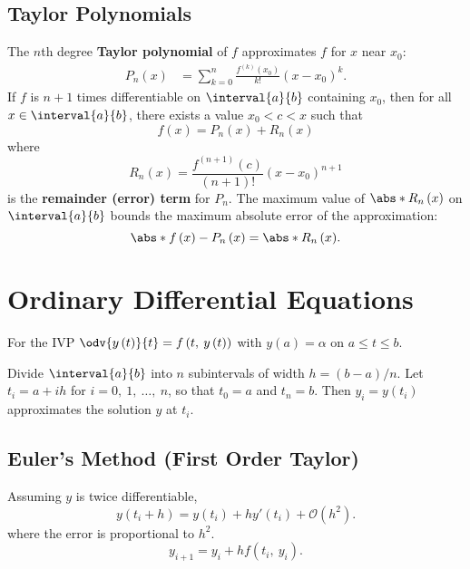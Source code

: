 \documentclass{article}
\begin{document}
\begin{multicols}{3}
    \subsection{Taylor Polynomials}
    The \(n\)th degree \textbf{Taylor polynomial} of \(f\)
    approximates \(f\) for \(x\) near \(x_0\):
    \begin{align*}
        P_n\left( x \right) & = \sum_{k = 0}^n \frac{f^{\left( k \right)}\left( x_0 \right)}{k!} \left( x - x_0 \right)^k.
    \end{align*}
    If \(f\) is \(n + 1\) times differentiable on \(\interval{a}{b}\) containing \(x_0\),
    then for all \(x \in \interval{a}{b}\),
    there exists a value \(x_0 < c < x\) such that
    \begin{equation*}
        f\left( x \right) = P_n\left( x \right) + R_n\left( x \right)
    \end{equation*}
    where
    \begin{equation*}
        R_n\left( x \right) = \frac{f^{\left( n + 1 \right)}\left( c \right)}{\left( n + 1 \right)!} \left( x - x_0 \right)^{n + 1}
    \end{equation*}
    is the \textbf{remainder (error) term} for \(P_n\).
    The maximum value of \(\abs*{R_n\left( x \right)}\) on \(\interval{a}{b}\) bounds the maximum absolute error of the approximation:
    \begin{equation*}
        \abs*{f\left( x \right) - P_n\left( x \right)} = \abs*{R_n\left( x \right)}.
    \end{equation*}
    \section{Ordinary Differential Equations}
    For the IVP \(\odv{y\left( t \right)}{t} = f\left( t,\: y\left( t \right) \right)\) with \(y\left( a \right) = \alpha\) on \(a \leq t \leq b\).

    Divide \(\interval{a}{b}\) into \(n\) subintervals of width \(h = \left( b - a \right) / n\).
    Let \(t_i = a + i h\) for \(i = 0,\: 1,\: \ldots,\: n\), so that \(t_0 = a\) and \(t_n = b\).
    Then \(y_i = y\left( t_i \right)\) approximates the solution \(y\) at \(t_i\).
    \subsection{Euler's Method (First Order Taylor)}
    Assuming \(y\) is twice differentiable,
    \begin{equation*}
        y\left( t_i + h \right) = y\left( t_i \right) + h y'\left( t_i \right) + \mathcal{O}\left( h^2 \right).
    \end{equation*}
    where the error is proportional to \(h^2\).
    \begin{equation*}
        y_{i + 1} = y_i + h f\left( t_i,\: y_i \right).
    \end{equation*}

\end{multicols}
\end{document}
